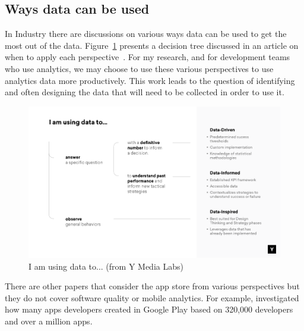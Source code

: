 \subsection{Ways data can be used}
In Industry there are discussions on various ways data can be used to get the most out of the data. Figure~\ref{fig:i_am_using_data_to} presents a decision tree discussed in an article on when to apply each perspective~\cite{amplitude_are_you_data_driven}. For my research, and for development teams who use analytics, we may choose to use these various perspectives to use analytics data more productively. This work leads to the question of identifying and often designing the data that will need to be collected in order to use it.

\begin{figure}
    \centering
    \includegraphics[width=15cm]{images/data-informed-graphic-ymedia-labs.png}
    \caption{I am using data to... (from Y Media Labs)~\cite{amplitude_are_you_data_driven}}
    \label{fig:i_am_using_data_to}
\end{figure}
\afterpage{\clearpage}


There are  other papers that consider the app store from various perspectives but they do not cover software quality or mobile analytics. For example, 
 investigated how many apps developers created in Google Play based on 320,000 developers and over a million apps.

